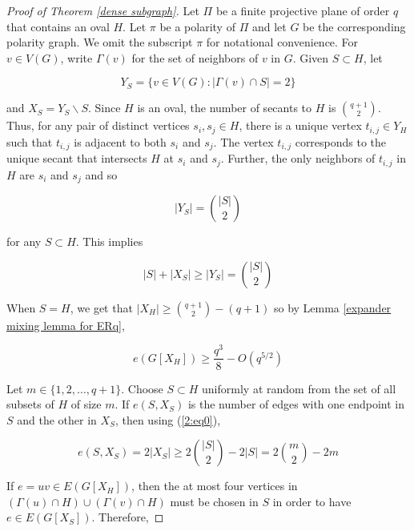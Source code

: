 \documentclass[12pt]{article}
\begin{document}
\begin{proof}[Proof of Theorem \ref{dense subgraph}]
    Let $\Pi$ be a finite projective plane of order $q$ that contains an oval $H$.  Let $\pi$ be a polarity of $\Pi$ and let $G$ be the corresponding polarity graph.  We omit the subscript $\pi$ for notational convenience.  For $v \in V(G)$, write $\Gamma (v)$ for the set of neighbors of $v$ in $G$.  Given $S \subset H$, let

    $$ Y_S = \{ v \in V(G) : | \Gamma (v) \cap S | = 2 \} $$

    and $X_S = Y_S \backslash S$.  Since $H$ is an oval, the number of secants to $H$ is $\binom{q+1}{2}$.
    Thus, for any pair of distinct vertices $s_i , s_j \in H$, there is a unique vertex $t_{i,j} \in Y_H$ such that
    $t_{i,j}$ is adjacent to both $s_i$ and $s_j$.  The vertex $t_{i,j}$ corresponds to the unique secant that intersects $H$ at
    $s_i$ and $s_j$.  Further, the only neighbors of $t_{i,j}$ in $H$ are $s_i$ and $s_j$ and so

    $$ |Y_S | = \binom{ |S| }{2} $$

    for any $S \subset H$.  This implies

    \begin{equation}\label{2:eq0}
        |S| + |X_S| \geq |Y_S| = \binom{ |S| }{2}
    \end{equation}

    When $S = H$, we get that $|X_H| \geq \binom{q+1}{2}  - (q  + 1)$ so by Lemma \ref{expander mixing lemma for ERq},

    \begin{equation}\label{22:eq1}
        e( G[ X_H] ) \geq \frac{q^3}{8} - O (q^{5/2})
    \end{equation}

    Let $m \in \{ 1,2 , \dots ,  q + 1 \}$.  Choose $S \subset H$ uniformly at random from the set of all subsets of $H$ of size $m$.  If
    $e(S , X_S)$ is the number of edges with one endpoint in $S$ and the other in $X_S$, then using (\ref{2:eq0}),

    \begin{equation}\label{2:eq1}
        e(S , X_S) = 2 |X_S| \geq 2 \binom{ |S| }{2} - 2 |S| = 2 \binom{m}{2} - 2m
    \end{equation}

    If $e = uv \in E( G[X_H] )$, then the at most four vertices in $( \Gamma (u) \cap H ) \cup ( \Gamma (v) \cap H )$ must be chosen in $S$ in order to have $e \in E( G [ X_S] )$.  Therefore,


\end{proof}
\end{document}
